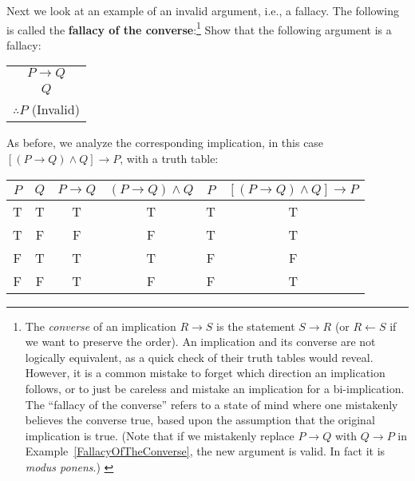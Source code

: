 Next we look at an example of an invalid argument, i.e., a fallacy.
The following is called the {\bf fallacy of the converse}:\footnote{%
The {\it converse} of an implication $R\longrightarrow S$ is 
the statement $S\longrightarrow R$ (or $R\longleftarrow S$
if we want to preserve the order).  An implication and
its converse are not logically equivalent, as a quick check of their
truth tables would reveal.  However, it is a common mistake to 
forget which direction an implication follows, or to just be
careless and mistake an implication for a bi-implication.
The ``fallacy of the converse'' refers to a state of mind where
one mistakenly believes the converse true, based upon the
assumption that the original implication is true.
(Note that if we mistakenly replace $P\longrightarrow Q$ with 
$Q\longrightarrow P$
in Example~\ref{FallacyOfTheConverse}, the new argument is valid.
In fact it is {\it modus ponens}.)
%
\label{FootnoteOnConverse}}
\bex Show that the following argument is a fallacy:
\begin{center}
\begin{tabular}{c}
$P\longrightarrow Q$\\ $Q$\\ \hline $\therefore P$ (Invalid)
\end{tabular}\end{center}
As before, we analyze the corresponding implication,
in this case
$[(P\rightarrow Q)\wedge Q]\longrightarrow P$, with a truth table:
\begin{center}
{\rm
\begin{tabular}{|c|c||c|c|c|c|}
\hline
$P$&$Q$&$P\rightarrow Q$&$(P\rightarrow Q)\wedge Q$
&$P$&$[(P\rightarrow Q)\wedge Q]\longrightarrow P$\\
\hline
T&T&T&T&T&T\\
T&F&F&F&T&T\\
F&T&T&T&F&F\\
F&F&T&F&F&T\\ \hline
\end{tabular}
}\end{center}
\label{FallacyOfTheConverse}\eex

